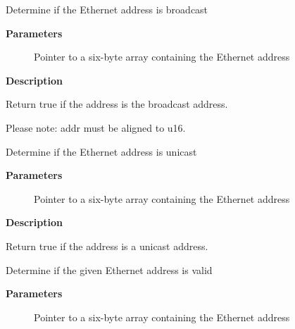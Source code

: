 \documentclass[a4paper,8pt,english]{sphinxmanual}
\begin{document}
\begin{fulllineitems}
\label{networking/kapi:c.is_broadcast_ether_addr}
Determine if the Ethernet address is broadcast

\end{fulllineitems}


\textbf{Parameters}
\begin{description}
\item[{}] \leavevmode
Pointer to a six-byte array containing the Ethernet address

\end{description}

\textbf{Description}

Return true if the address is the broadcast address.

Please note: addr must be aligned to u16.

\begin{fulllineitems}
\label{networking/kapi:c.is_unicast_ether_addr}
Determine if the Ethernet address is unicast

\end{fulllineitems}


\textbf{Parameters}
\begin{description}
\item[{}] \leavevmode
Pointer to a six-byte array containing the Ethernet address

\end{description}

\textbf{Description}

Return true if the address is a unicast address.

\begin{fulllineitems}
\label{networking/kapi:c.is_valid_ether_addr}
Determine if the given Ethernet address is valid

\end{fulllineitems}


\textbf{Parameters}
\begin{description}
\item[{}] \leavevmode
Pointer to a six-byte array containing the Ethernet address

\end{description}
\end{document}
